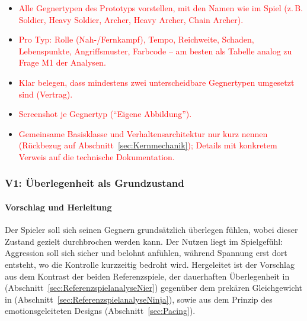 \documentclass[../Main.tex]{subfiles}
\begin{document}
\begin{itemize}[leftmargin=1.5cm]
    \item \textcolor{red}{Alle Gegnertypen des Prototyps vorstellen, mit den Namen wie im Spiel (z.\,B. Soldier, Heavy Soldier, Archer, Heavy Archer, Chain Archer).}
    \item \textcolor{red}{Pro Typ: Rolle (Nah-/Fernkampf), Tempo, Reichweite, Schaden, Lebenspunkte, Angriffsmuster, Farbcode -- am besten als Tabelle analog zu Frage M1 der Analysen.}
    \item \textcolor{red}{Klar belegen, dass mindestens zwei unterscheidbare Gegnertypen umgesetzt sind (Vertrag).}
    \item \textcolor{red}{Screenshot je Gegnertyp (\enquote{Eigene Abbildung}).}
    \item \textcolor{red}{Gemeinsame Basisklasse und Verhaltensarchitektur nur kurz nennen (Rückbezug auf Abschnitt~\ref{sec:Kernmechanik}); Details mit konkretem Verweis auf die technische Dokumentation.}
\end{itemize}

\subsubsection{V1: Überlegenheit als Grundzustand} \label{sec:V1}

\paragraph{Vorschlag und Herleitung}
Der Spieler soll sich seinen Gegnern grundsätzlich überlegen fühlen, wobei dieser Zustand gezielt durchbrochen werden kann. Der Nutzen liegt im Spielgefühl: Aggression soll sich sicher und belohnt anfühlen, während Spannung erst dort entsteht, wo die Kontrolle kurzzeitig bedroht wird. Hergeleitet ist der Vorschlag aus dem Kontrast der beiden Referenzspiele, der dauerhaften Überlegenheit in  (Abschnitt~\ref{sec:ReferenzspielanalyseNier}) gegenüber dem prekären Gleichgewicht in  (Abschnitt~\ref{sec:ReferenzspielanalyseNinja}), sowie aus dem Prinzip des emotionsgeleiteten Designs (Abschnitt~\ref{sec:Pacing}).
\end{document}
